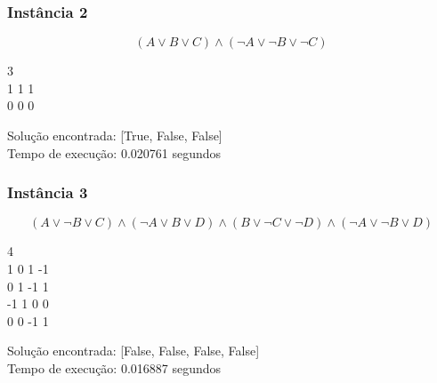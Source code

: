 \documentclass[12pt]{article}
\begin{document}
    \subsubsection{Instância 2}
        \[(A \lor B \lor C) \land (\neg A \lor \neg B \lor \neg C)\]
        \begin{tcolorbox}[title=Entrada da instância 2, width=\linewidth, 
          fontupper=\ttfamily, 
          halign=flush left]
            3 \\
            1 1 1 \\
            0 0 0 \\
        \end{tcolorbox}
        
        \begin{tcolorbox}[title=Saída da instância 2, width=\linewidth, fontupper=\ttfamily, halign=flush left]
            Solução encontrada: [True, False, False] \\
            Tempo de execução: 0.020761 segundos
        \end{tcolorbox}

    \subsubsection{Instância 3}
        \[(A \lor \neg B \lor C) \land (\neg A \lor B \lor D) \land (B \lor \neg C \lor \neg D) \land (\neg A \lor \neg B \lor D)\]
        \begin{tcolorbox}[title=Entrada da instância 3, width=\linewidth, fontupper=\ttfamily,  halign=flush left]
            4 \\
            1 0 1 -1 \\
            0 1 -1 1 \\
            -1 1 0 0 \\
            0 0 -1 1 \\

        \end{tcolorbox}
        \begin{tcolorbox}[title=Saída da instância 3, width=\linewidth, fontupper=\ttfamily, halign=flush left]
            Solução encontrada: [False, False, False, False] \\
            Tempo de execução: 0.016887 segundos
        \end{tcolorbox}

\end{document}
